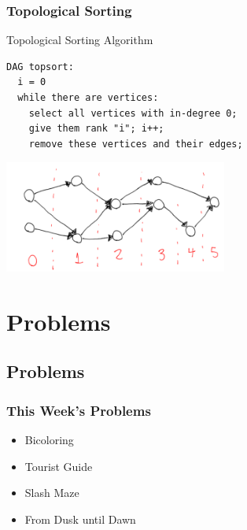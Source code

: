 \documentclass{beamer}
\begin{document}
\begin{frame}
  \frametitle{Topological Sorting}
  \begin{block}{Topological Sorting Algorithm}
\begin{verbatim}
DAG topsort:
  i = 0
  while there are vertices:
    select all vertices with in-degree 0;
    give them rank "i"; i++;
    remove these vertices and their edges;
\end{verbatim}
  \end{block}
  \begin{center}
    \includegraphics[width=0.55\textwidth]{topological2}
  \end{center}
\end{frame}

\section{Problems}
\subsection{Problems}
\begin{frame}
  \frametitle{This Week's Problems}
  \begin{itemize}
  \item Bicoloring
  \item Tourist Guide
  \item Slash Maze
  \item From Dusk until Dawn
  \end{itemize}
\end{frame}
\end{document}

